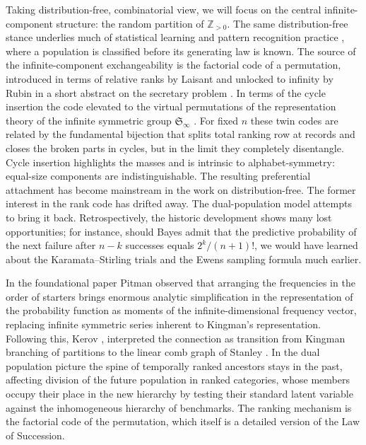 \documentclass[11pt]{article}
\theoremstyle{plain}
\theoremstyle{definition}
\begin{document}
Taking distribution-free, combinatorial view,   we will focus on the central   infinite-component structure: the random partition of \(\mathbb{Z}_{>0}\). The same distribution-free stance underlies much of statistical learning and pattern recognition practice \cite{merkov2011}, where a population is classified before its generating law is known. The source of the infinite-component 
exchangeability is the factorial code of a permutation, introduced in terms of relative ranks by Laisant \cite{Laisant1888}
and unlocked to infinity by Rubin in a short abstract on the secretary problem \cite{Rubin1966}. 
In  terms of the cycle insertion the code elevated
to the  virtual permutations of the representation theory of the infinite symmetric group ${\mathfrak S}_\infty$ \cite{BorodinOlshanski}.
For fixed \(n\) these twin codes are related by the fundamental bijection that splits total ranking row
at records and closes the broken parts in cycles, 
   but in the limit they completely disentangle.
Cycle insertion highlights the masses and is intrinsic to alphabet-symmetry: equal-size components are indistinguishable. The resulting preferential attachment has become  mainstream in the
work on distribution-free. The former interest in  the rank code \cite{Hill}
has drifted away. The dual-population model attempts to bring it back.
Retrospectively, the  historic development shows many lost opportunities;
 for instance, should Bayes admit that the predictive probability of the next failure after \(n-k\) successes equals \(2^k/(n+1)!\), we would have learned about the Karamata--Stirling 
trials and the Ewens sampling formula much earlier.


In the foundational paper Pitman \cite{PitmanPTRF} observed that arranging the  frequencies in the order of starters brings enormous analytic simplification in the representation
of the probability function as moments of the infinite-dimensional frequency vector, replacing infinite symmetric series inherent to Kingman's representation. 
Following this,   Kerov \cite{KerovSubordinators}, interpreted the connection as transition from Kingman branching of partitions to   the linear comb graph of Stanley \cite{StanleyFibonacciLattice}.
In the dual population picture the spine of temporally ranked ancestors stays in the past, affecting 
division of the future population in ranked categories, whose members  occupy their place 
in the new hierarchy by testing their standard latent variable against the inhomogeneous hierarchy of benchmarks.
The ranking mechanism is the factorial code of the permutation, which itself is a detailed version of the Law of Succession.
\end{document}
